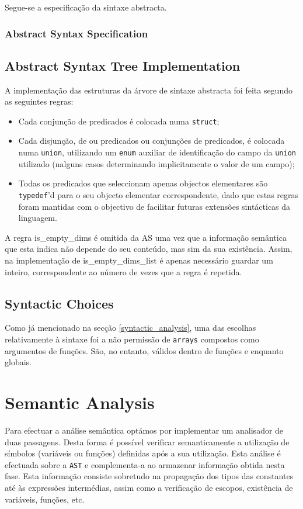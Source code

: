 \documentclass[a4paper]{article}
\begin{document}
Segue-se a especificação da sintaxe abstracta.

\cleardoublepage

\subsubsection{Abstract Syntax Specification}


\cleardoublepage

\subsection{Abstract Syntax Tree Implementation}
A implementação das estruturas da árvore de sintaxe abstracta foi feita segundo as seguintes regras:
\begin{itemize}
	\item Cada conjunção de predicados é colocada numa \texttt{struct};
	\item Cada disjunção, de ou predicados ou conjunções de predicados, é colocada numa \texttt{union},
		utilizando um \texttt{enum} auxiliar de identificação do campo da \texttt{union} utilizado
		(nalguns casos determinando implicitamente o valor de um campo);
	\item Todas os predicados que seleccionam apenas objectos elementares são \texttt{typedef}'d para o seu objecto elementar correspondente,
		dado que estas regras foram mantidas com o objectivo de facilitar futuras extensões sintácticas da linguagem.
\end{itemize}

A regra is\_empty\_dims é omitida da AS uma vez que a informação semântica que esta indica não depende do seu conteúdo, mas sim da sua existência.
Assim, na implementação de is\_empty\_dims\_list é apenas necessário guardar um inteiro, correspondente ao número de vezes que a regra é repetida.

\subsection{Syntactic Choices}
\indent \indent Como já mencionado na secção \ref{syntactic_analysis}, uma das escolhas relativamente à sintaxe foi a não permissão de \texttt{arrays} compostos
como argumentos de funções. São, no entanto, válidos dentro de funções e enquanto globais.

\cleardoublepage
\section{Semantic Analysis}
\indent \indent Para efectuar a análise semântica optámos por implementar um analisador de duas passagens. Desta forma
é possível verificar semanticamente a utilização de símbolos (variáveis ou funções) definidas após a sua utilização. Esta
análise é efectuada sobre a \texttt{AST} e complementa-a ao armazenar informação obtida nesta fase. Esta informação
consiste sobretudo na propagação dos tipos das constantes até às expressões intermédias, assim como a verificação
de escopos, existência de variáveis, funções, etc.
\end{document}
